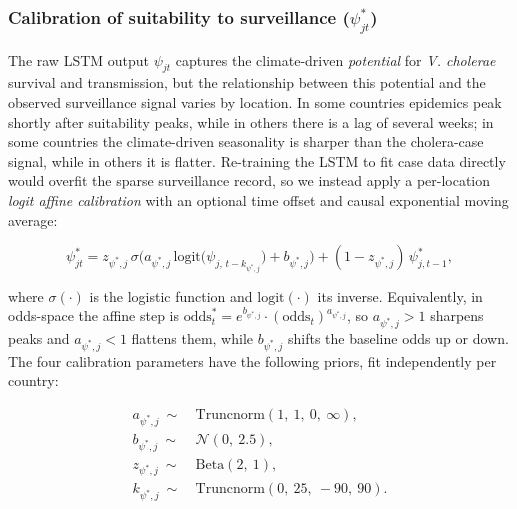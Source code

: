\documentclass[
]{book}
\begin{document}
\subsubsection{\texorpdfstring{Calibration of suitability to surveillance (\(\psi^{\ast}_{jt}\))}{Calibration of suitability to surveillance (\textbackslash psi\^{}\{\textbackslash ast\}\_\{jt\})}}\label{calibration-of-suitability-to-surveillance-psiast_jt}

The raw LSTM output \(\psi_{jt}\) captures the climate-driven \emph{potential} for \emph{V. cholerae} survival and transmission, but the relationship between this potential and the observed surveillance signal varies by location. In some countries epidemics peak shortly after suitability peaks, while in others there is a lag of several weeks; in some countries the climate-driven seasonality is sharper than the cholera-case signal, while in others it is flatter. Re-training the LSTM to fit case data directly would overfit the sparse surveillance record, so we instead apply a per-location \emph{logit affine calibration} with an optional time offset and causal exponential moving average:

\begin{equation}
\psi^{\ast}_{jt} = z_{\psi^{\ast},j}\, \sigma\!\big(a_{\psi^{\ast},j}\, \text{logit}\big(\psi_{j,\,t - k_{\psi^{\ast},j}}\big) + b_{\psi^{\ast},j}\big) + (1 - z_{\psi^{\ast},j})\, \psi^{\ast}_{j,t-1},
\label{eq:psi-star}
\end{equation}

where \(\sigma(\cdot)\) is the logistic function and \(\text{logit}(\cdot)\) its inverse. Equivalently, in odds-space the affine step is \(\text{odds}^{\ast}_t = e^{b_{\psi^{\ast},j}} \cdot (\text{odds}_t)^{a_{\psi^{\ast},j}}\), so \(a_{\psi^{\ast},j} > 1\) sharpens peaks and \(a_{\psi^{\ast},j} < 1\) flattens them, while \(b_{\psi^{\ast},j}\) shifts the baseline odds up or down. The four calibration parameters have the following priors, fit independently per country:

\[
\begin{aligned}
a_{\psi^{\ast},j} \ \sim\ & \text{Truncnorm}(1,\ 1,\ 0,\ \infty),\\
b_{\psi^{\ast},j} \ \sim\ & \mathcal{N}(0,\ 2.5),\\
z_{\psi^{\ast},j} \ \sim\ & \text{Beta}(2,\ 1),\\
k_{\psi^{\ast},j} \ \sim\ & \text{Truncnorm}(0,\ 25,\ -90,\ 90).
\end{aligned}
\label{eq:psi-star-priors}
\]
\end{document}
